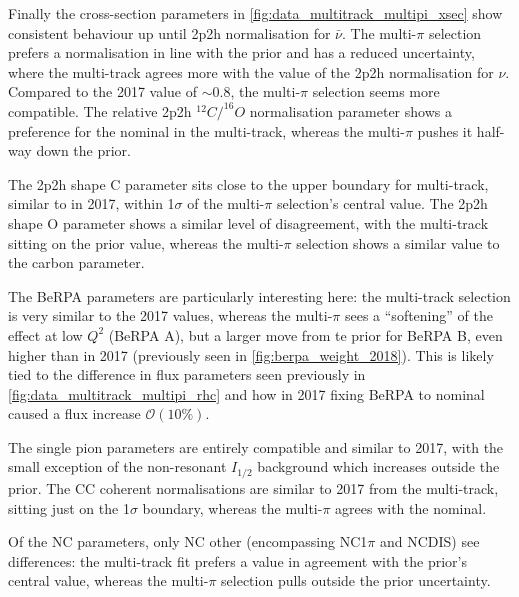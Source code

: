 Finally the cross-section parameters in \autoref{fig:data_multitrack_multipi_xsec} show consistent behaviour up until 2p2h normalisation for $\bar{\nu}$. The multi-$\pi$ selection prefers a normalisation in line with the prior and has a reduced uncertainty, where the multi-track agrees more with the value of the 2p2h normalisation for $\nu$. Compared to the 2017 value of $\sim0.8$, the multi-$\pi$ selection seems more compatible. The relative 2p2h $^{12}C/^{16}O$ normalisation parameter shows a preference for the nominal in the multi-track, whereas the multi-$\pi$ pushes it half-way down the prior.

The 2p2h shape C parameter sits close to the upper boundary for multi-track, similar to in 2017, within 1$\sigma$ of the multi-$\pi$ selection's central value. The 2p2h shape O parameter shows a similar level of disagreement, with the multi-track sitting on the prior value, whereas the multi-$\pi$ selection shows a similar value to the carbon parameter. 

The BeRPA parameters are particularly interesting here: the multi-track selection is very similar to the 2017 values, whereas the multi-$\pi$ sees a ``softening'' of the effect at low $Q^2$ (BeRPA A), but a larger move from te prior for BeRPA B, even higher than in 2017 (previously seen in \autoref{fig:berpa_weight_2018}). This is likely tied to the difference in flux parameters seen previously in \autoref{fig:data_multitrack_multipi_rhc} and how in 2017 fixing BeRPA to nominal caused a flux increase $\mathcal{O}(10\%)$.

The single pion parameters are entirely compatible and similar to 2017, with the small exception of the non-resonant $I_{1/2}$ background which increases outside the prior. The CC coherent normalisations are similar to 2017 from the multi-track, sitting just on the 1$\sigma$ boundary, whereas the multi-$\pi$ agrees with the nominal.

Of the NC parameters, only NC other (encompassing NC1$\pi$ and NCDIS) see differences: the multi-track fit prefers a value in agreement with the prior's central value, whereas the multi-$\pi$ selection pulls outside the prior uncertainty.

